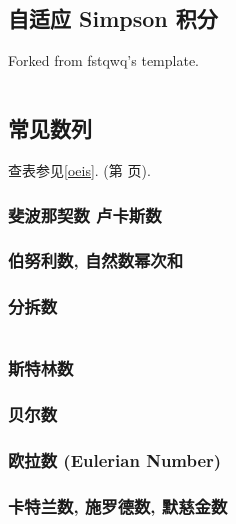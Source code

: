 \documentclass[a4paper, twoside]{article}
\begin{document}
\begin{multicols}{2}
			\subsection{自适应 Simpson 积分}
				Forked from fstqwq's template.
				\inputminted{cpp}{../src/math/simpson.cpp}

			\subsection{常见数列}
				查表参见\ref{oeis}. (第 \pageref{oeis} 页).

				\subsubsection{斐波那契数 卢卡斯数}
					

				\subsubsection{伯努利数, 自然数幂次和}
					\label{bernoulli}
					
				
				\subsubsection{分拆数}
					\inputminted{cpp}{../src/math/分拆数.cpp}
				
				\subsubsection{斯特林数}
					
				
				\subsubsection{贝尔数}
					
				
				\subsubsection{欧拉数 (Eulerian Number)}
					
				
				\subsubsection{卡特兰数, 施罗德数, 默慈金数}
					\label{catalan}
					
			

\end{multicols}
\end{document}
